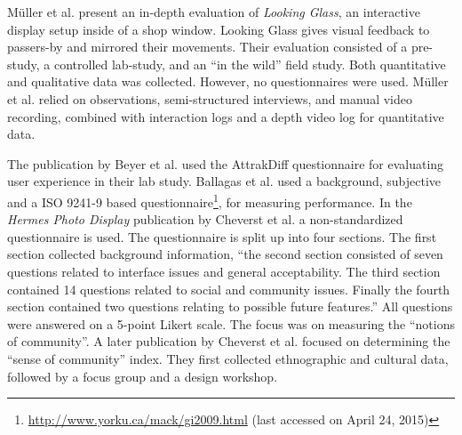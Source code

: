 	M{\"u}ller et al. \cite{Muller2012LookingGlass} present an in-depth evaluation of \textit{Looking Glass}, an interactive display setup inside of a shop window. Looking Glass gives visual feedback to passers-by and mirrored their movements. Their evaluation consisted of a pre-study, a controlled lab-study, and an ``in the wild'' field study. Both quantitative and qualitative data was collected. However, no questionnaires were used. M{\"u}ller et al. relied on observations, semi-structured interviews, and manual video recording, combined with interaction logs and a depth video log for quantitative data.

	The publication by Beyer et al. \cite{Beyer2011} used the AttrakDiff questionnaire for evaluating user experience in their lab study. 
	Ballagas et al. \cite{Ballagas2005} used a background, subjective and a ISO 9241-9 based questionnaire\footnote{\url{http://www.yorku.ca/mack/gi2009.html} (last accessed on April 24, 2015)}, for measuring performance.
	In the \textit{Hermes Photo Display} publication by Cheverst et al. \cite{cheverst2005hermes} a non-standardized questionnaire is used. The questionnaire is split up into four sections. The first section collected background information, ``the second section consisted of seven questions related to interface issues and general acceptability. The third section contained 14 questions related to social and community issues. Finally the fourth section contained two questions relating to possible future features.'' All questions were answered on a 5-point Likert scale. The focus was on measuring the ``notions of community''.
	A later publication by Cheverst et al. \cite{Cheverst2008} focused on determining the ``sense of community'' index. They first collected ethnographic and cultural data, followed by a focus group and a design workshop.








